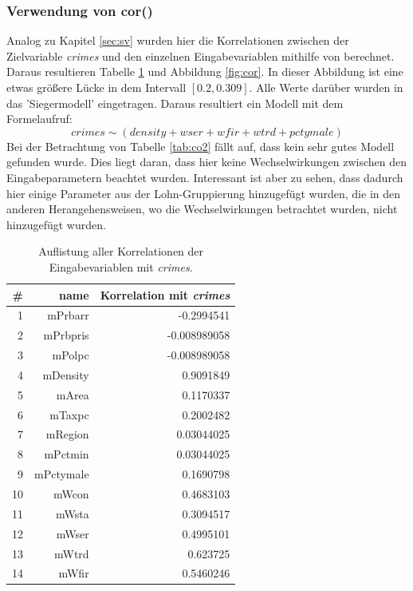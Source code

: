 \subsubsection{Verwendung von cor()}
Analog zu Kapitel \ref{sec:sv} wurden hier die Korrelationen zwischen der Zielvariable \textit{crimes} und den einzelnen Eingabevariablen mithilfe von  berechnet.
Daraus resultieren Tabelle \ref{tab:cor} und Abbildung \ref{fig:cor}.
In dieser Abbildung ist eine etwas gr\"o\ss{}ere L\"ucke in dem Intervall $[0.2, 0.309]$.
Alle Werte dar\"uber wurden in das 'Siegermodell' eingetragen.
Daraus resultiert ein Modell mit dem Formelaufruf:
\begin{equation}
crimes \sim (density+wser+wfir+wtrd+pctymale)
\end{equation} 
Bei der Betrachtung von Tabelle \ref{tab:co2} f\"allt auf, dass kein sehr gutes Modell gefunden wurde.
Dies liegt daran, dass hier keine Wechselwirkungen zwischen den Eingabeparametern beachtet wurden.
Interessant ist aber zu sehen, dass dadurch hier einige Parameter aus der Lohn-Gruppierung hinzugef\"ugt wurden, die in den anderen Herangehensweisen, wo die Wechselwirkungen betrachtet wurden, nicht hinzugef\"ugt wurden.

\begin{table}[ht]
\centering
\begin{tabular}{rrr}
  \hline
  # & name & Korrelation mit \textit{crimes} \\ 
  \hline
  1 & mPrbarr & -0.2994541\\ 
  2 & mPrbpris & -0.008989058 \\ 
  3 & mPolpc & -0.008989058\\ 
  4 & mDensity & 0.9091849\\ 
  5 & mArea & 0.1170337\\ 
  6 & mTaxpc &  0.2002482\\ 
  7 & mRegion & 0.03044025\\ 
  8 & mPctmin & 0.03044025\\ 
  9 & mPctymale & 0.1690798\\ 
  10 & mWcon & 0.4683103\\ 
  11 & mWsta & 0.3094517\\ 
  12 & mWser & 0.4995101\\ 
  13 & mWtrd & 0.623725\\ 
  14 & mWfir & 0.5460246\\ 
   \hline
\end{tabular}
\caption{Auflistung aller Korrelationen der Eingabevariablen mit \textit{crimes}.}
\label{tab:cor}
\end{table}

